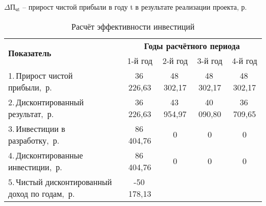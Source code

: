 $\Delta\text{П}_{\text{чt}}$  – прирост чистой прибыли в году t в результате реализации проекта, р.
\begin{table}[H]
	\caption{Расчёт эффективности инвестиций}
	\label{tab3}
	\centering
	\begin{tabular}{|p{6.3cm}|c|c|c|c|}
		\hline
		\multirow{2}{6.3cm}{\textbf{Показатель}}                 & \multicolumn{4}{c|}{\textbf{Годы расчётного периода}}                               \\
		\cline{2-5}
		                                                         & 1-й год                                               & 2-й год & 3-й год & 4-й год \\
		\hline
		1.\,Прирост чистой прибыли,~р.                           &
		36\,226,63                                                        &
		48\,302,17                                              &
		48\,302,17                                              &
		48\,302,17                                                                                                                                    \\
		\hline
		2.\,Дисконтированный результат,~р.                       &
		36\,226,63                                                        &
		43\,954,97                                              &
		40\,090,80                                             &
		36\,709,65                                                                                                                                    \\
		\hline
		3.\,Инвестиции в разработку,~р.                          &
		86\,404,76                                               &
		0                                                        &
		0                                                        &
		0                                                                                                                                              \\
		\hline
		4.\,Дисконтированные инвестиции,~р.                      &
		86\,404,76                                               &
		0                                                        &
		0                                                        &
		0                                                                                                                                              \\
		\hline
		5.\,Чистый дисконтированный доход по годам,~р.           &
		-50\,178,13                                              &

\end{tabular}
\end{table}
